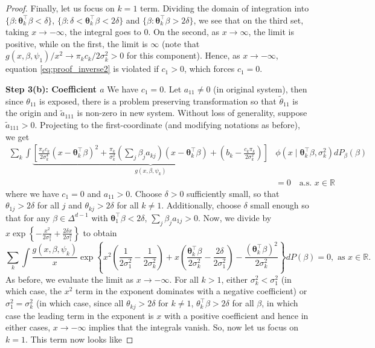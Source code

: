 \documentclass[bj,authoryear]{imsart}
\theoremstyle{plain}
\theoremstyle{remark}
\def\btheta{{\boldsymbol\theta}}
\def\bbR{\mathbb{R}}
\begin{document}
\begin{appendix}
\begin{proof}
    Finally, let us focus on $k=1$ term. Dividing the domain of integration into $\{\beta: \btheta_k^\top\beta < \delta\}$, $\{\beta: \delta < \btheta_k^\top\beta < 2\delta\}$ and $\{\beta: \btheta_k^\top\beta > 2\delta\}$, we see that on the third set, taking $x\to-\infty$, the integral goes to 0. On the second, as $x\to\infty$, the limit is positive, while on the first, the limit is $\infty$ (note that $g(x,\beta,\psi_1)/x^2 \to \pi_kc_k/2\sigma_k^2 >0$ for this component). Hence, as $x\to -\infty$, equation \eqref{eq:proof_inverse2} is violated if $c_1>0$, which forces $c_1=0$.

    \vspace{0.5em}
    \textbf{Step 3(b): Coefficient $a$} We have $c_1=0$. Let $a_{11}\neq 0$ (in original system), then since $\theta_{11}$ is exposed, there is a problem preserving transformation so that $\tilde{\theta}_{11}$ is the origin and $\tilde{a}_{111}$ is non-zero in new system. Without loss of generality, suppose $\tilde{a}_{111}>0$. Projecting to the first-coordinate (and modifying notations as before), we get
    \begin{align}\label{eq:inverse_bound_a}
        \sum_k \int \underbrace{\left[\frac{\pi_k c_k}{2\sigma_k^4} (x - \btheta_{k}^\top \beta)^2 + \frac{\pi_k}{\sigma_k^2}(\sum_j \beta_j a_{kj}) (x - \btheta_{k}^\top\beta) + \left(b_k - \frac{c_k \pi_k}{2\sigma_k^2}\right)\right]}_{g(x,\beta,\psi_k)}&\phi(x\mid \btheta_{k}^\top\beta, \sigma_k^2)dP_{\beta}(\beta) \nonumber\\
        &=0 \quad \text{a.s. } x\in\bbR
    \end{align}
    where we have $c_1=0$ and $a_{11}>0$. Choose $\delta>0$ sufficiently small, so that $\theta_{1j}>2\delta$ for all $j$ and $\theta_{kj}>2\delta$ for all $k\neq 1$. Additionally, choose $\delta$ small enough so that for any $\beta\in\Delta^{d-1}$ with $\btheta_1^\top\beta<2\delta$, $\sum_j \beta_j a_{1j} > 0$. Now, we divide by $x \exp\left\{-\frac{x^2}{2\sigma_1^2} + \frac{2\delta x}{2\sigma_1^2}\right\}$ to obtain
    \begin{equation}\label{eq:proof_inverse3}
        \sum_k \int \frac{g(x,\beta,\psi_k)}{x} \exp \left\{x^2\left(\frac{1}{2\sigma_1^2}-\frac{1}{2\sigma_k^2}\right) + x\left(\frac{\btheta_k^\top\beta}{2\sigma_k^2} - \frac{2\delta}{2\sigma_1^2}\right) - \frac{(\btheta_k^\top\beta)^2}{2\sigma_k^2}\right\} dP(\beta)= 0, \text{ as } x\in \bbR.
    \end{equation}
    As before, we evaluate the limit as $x\to - \infty$. For all $k>1$, either $\sigma_k^2<\sigma_1^2$ (in which case, the $x^2$ term in the exponent dominates with a negative coefficient) or $\sigma_1^2=\sigma_k^2$ (in which case, since all $\theta_{kj}>2\delta$ for $k\neq 1$, $\theta_k^\top\beta > 2\delta$ for all $\beta$, in which case the leading term in the exponent is $x$ with a positive coefficient and hence in either cases, $x\to - \infty$ implies that the integrals vanish. So, now let us focus on $k=1$. This term now looks like

\end{proof}
\end{appendix}
\end{document}
